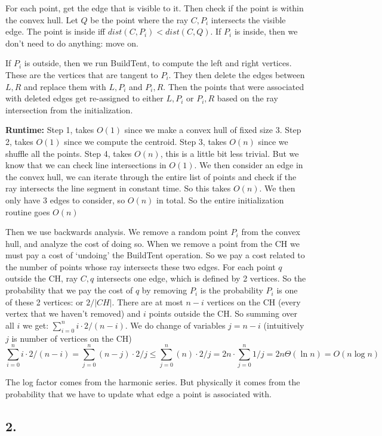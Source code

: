 \documentclass[11pt]{article}
\begin{document}
For each point, get the edge that is visible to it. Then check if the point is within the convex hull.
Let $Q$ be the point where the ray $C, P_i$ intersects the visible edge. The point is inside iff $dist(C, P_i) < dist(C, Q)$.
If $P_i$ is inside, then we don't need to do anything: move on.

If $P_i$ is outside, then we run BuildTent, to compute the left and right vertices. 
These are the vertices that are tangent to $P_i$. 
They then delete the edges between $L, R$ and replace them with $L,P_i$ and $P_i, R$.
Then the points that were associated with deleted edges get re-assigned to either 
$L,P_i$ or $P_i, R$ based on the ray intersection from the initialization.

\textbf{Runtime: }
Step 1, takes $O(1)$ since we make a convex hull of fixed size 3.
Step 2, takes $O(1)$ since we compute the centroid.
Step 3, takes $O(n)$ since we shuffle all the points. 
Step 4, takes $O(n)$, this is a little bit less trivial. But we know that we can check
line intersections in $O(1)$. We then consider an edge in the convex hull, we can iterate through
the entire list of points and check if the ray intersects the line segment in constant time. So this takes $O(n)$.
We then only have 3 edges to consider, so $O(n)$ in total.
So the entire initialization routine goes $O(n)$

Then we use backwards analysis. We remove a random point $P_i$ from the convex hull,
and analyze the cost of doing so. When we remove a point from the CH we must pay a cost of `undoing' the BuildTent operation.
So we pay a cost related to the number of points whose ray intersects these two edges.
For each point $q$ outside the CH, ray $C,q$ intersects one edge, which is defined by 2 vertices.
So the probability that we pay the cost of $q$ by removing $P_i$ is the probability $P_i$ is one
of these 2 vertices: or $2/|CH|$. There are at most $n-i$ vertices on the CH (every vertex that we haven't removed)
and $i$ points outside the CH. So summing over all $i$ we get:
$\sum_{i = 0} ^n i \cdot 2/(n-i)$. We do change of variables $j = n-i$ (intuitively $j$ is number of vertices on the CH)
$$\sum_{i = 0} ^n i \cdot 2/(n-i) = \sum_{j = 0} ^n (n-j) \cdot 2/j \leq \sum_{j = 0} ^n (n) \cdot 2/j = 2n \cdot \sum_{j = 0} ^n 1/j = 2n \Theta(\ln n) = O(n \log n)$$

The log factor comes from the harmonic series. But physically it comes from the probability that we have to update what edge a point is associated with.

\subsection*{2. }
\end{document}

